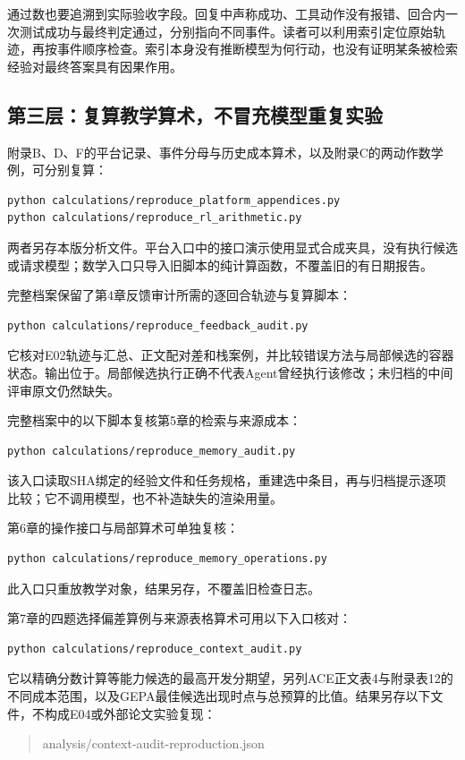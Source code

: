 通过数也要追溯到实际验收字段。回复中声称成功、工具动作没有报错、回合内一次测试成功与最终判定通过，分别指向不同事件。读者可以利用索引定位原始轨迹，再按事件顺序检查。索引本身没有推断模型为何行动，也没有证明某条被检索经验对最终答案具有因果作用。

\subsection{第三层：复算教学算术，不冒充模型重复实验}

附录B、D、F的平台记录、事件分母与历史成本算术，以及附录C的两动作数学例，可分别复算：
\begin{verbatim}
python calculations/reproduce_platform_appendices.py
python calculations/reproduce_rl_arithmetic.py
\end{verbatim}
两者另存本版分析文件。平台入口中的接口演示使用显式合成夹具，没有执行候选或请求模型；数学入口只导入旧脚本的纯计算函数，不覆盖旧的有日期报告。

完整档案保留了第4章反馈审计所需的逐回合轨迹与复算脚本：
\begin{verbatim}
python calculations/reproduce_feedback_audit.py
\end{verbatim}
它核对E02轨迹与汇总、正文配对差和栈案例，并比较错误方法与局部候选的容器状态。输出位于。局部候选执行正确不代表Agent曾经执行该修改；未归档的中间评审原文仍然缺失。

完整档案中的以下脚本复核第5章的检索与来源成本：
\begin{verbatim}
python calculations/reproduce_memory_audit.py
\end{verbatim}
该入口读取SHA绑定的经验文件和任务规格，重建选中条目，再与归档提示逐项比较；它不调用模型，也不补造缺失的渲染用量。

第6章的操作接口与局部算术可单独复核：
\begin{verbatim}
python calculations/reproduce_memory_operations.py
\end{verbatim}
此入口只重放教学对象，结果另存，不覆盖旧检查日志。

第7章的四题选择偏差算例与来源表格算术可用以下入口核对：
\begin{verbatim}
python calculations/reproduce_context_audit.py
\end{verbatim}
它以精确分数计算等能力候选的最高开发分期望，另列ACE正文表4与附录表12的不同成本范围，以及GEPA最佳候选出现时点与总预算的比值。结果另存以下文件，不构成E04或外部论文实验复现：
\begin{quote}\ttfamily
analysis/\allowbreak context-audit-reproduction.json
\end{quote}

